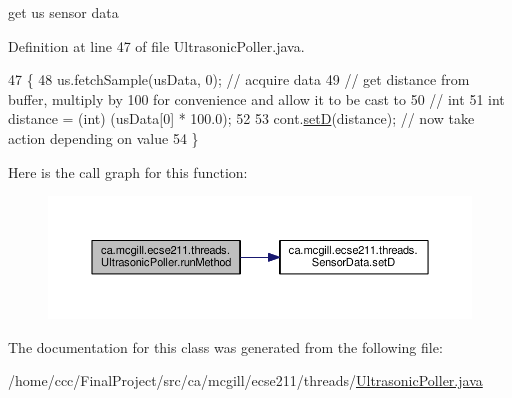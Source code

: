 get us sensor data 

Definition at line 47 of file Ultrasonic\+Poller.\+java.


\begin{DoxyCode}
47                              \{
48     us.fetchSample(usData, 0); \textcolor{comment}{// acquire data}
49     \textcolor{comment}{// get distance from buffer, multiply by 100 for convenience and allow it to be cast to}
50     \textcolor{comment}{// int}
51     \textcolor{keywordtype}{int} distance = (int) (usData[0] * 100.0);
52 
53     cont.\hyperlink{classca_1_1mcgill_1_1ecse211_1_1threads_1_1_sensor_data_a2c1f8e625478b89aabe6e9911e482ef3}{setD}(distance); \textcolor{comment}{// now take action depending on value}
54   \}
\end{DoxyCode}
Here is the call graph for this function\+:\nopagebreak
\begin{figure}[H]
\begin{center}
\leavevmode
\includegraphics[width=350pt]{classca_1_1mcgill_1_1ecse211_1_1threads_1_1_ultrasonic_poller_a8e6a84342aedc1b72741dbc2e80148c4_cgraph}
\end{center}
\end{figure}


The documentation for this class was generated from the following file\+:\begin{DoxyCompactItemize}
\item 
/home/ccc/\+Final\+Project/src/ca/mcgill/ecse211/threads/\hyperlink{_ultrasonic_poller_8java}{Ultrasonic\+Poller.\+java}\end{DoxyCompactItemize}
